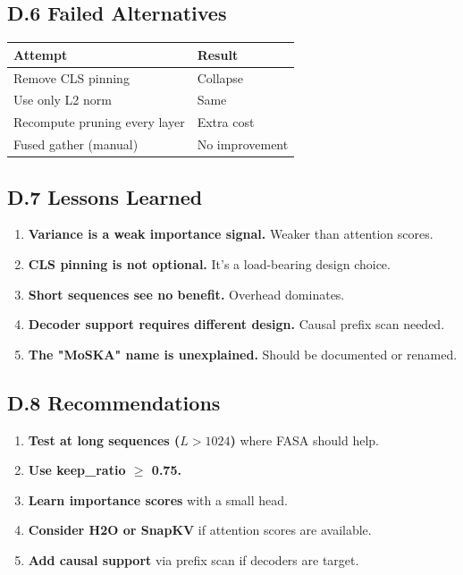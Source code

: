 \subsection{D.6 Failed Alternatives}

\begin{table}[H]
\centering
\small
\begin{tabular}{ll}
\toprule
\textbf{Attempt} & \textbf{Result} \\
\midrule
Remove CLS pinning & Collapse \\
Use only L2 norm & Same \\
Recompute pruning every layer & Extra cost \\
Fused gather (manual) & No improvement \\
\bottomrule
\end{tabular}
\end{table}

\subsection{D.7 Lessons Learned}

\begin{enumerate}
\item \textbf{Variance is a weak importance signal.} Weaker than attention scores.
\item \textbf{CLS pinning is not optional.} It's a load-bearing design choice.
\item \textbf{Short sequences see no benefit.} Overhead dominates.
\item \textbf{Decoder support requires different design.} Causal prefix scan needed.
\item \textbf{The "MoSKA" name is unexplained.} Should be documented or renamed.

\end{enumerate}
\subsection{D.8 Recommendations}

\begin{enumerate}
\item \textbf{Test at long sequences ($L > 1024$)} where FASA should help.
\item \textbf{Use keep\_ratio $\ge$ 0.75.}
\item \textbf{Learn importance scores} with a small head.
\item \textbf{Consider H2O or SnapKV} if attention scores are available.
\item \textbf{Add causal support} via prefix scan if decoders are target.

\end{enumerate}
